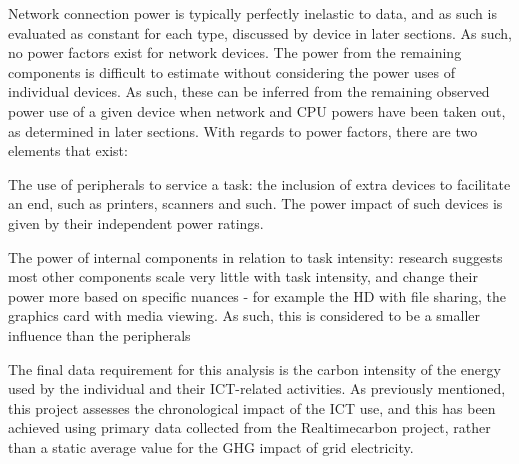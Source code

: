 \documentclass[conference]{IEEEtran}
\begin{document}
Network connection power is typically perfectly inelastic to data, and
as such is evaluated as constant for each type, discussed by device in
later sections. As such, no power factors exist for network
devices. The power from the remaining components is difficult to
estimate without considering the power uses of individual devices. As
such, these can be inferred from the remaining observed power use of a
given device when network and CPU powers have been taken out, as
determined in later sections. With regards to power factors, there are
two elements that exist:

\begin{compactitem}
\item The use of peripherals to service a task: the inclusion of extra
devices to facilitate an end, such as printers, scanners and such. The
power impact of such devices is given by their independent power
ratings.

\item The power of internal components in relation to task intensity:
  research suggests most other components scale very little with task
intensity, and change their power more based on specific nuances - for
example the HD with file sharing, the graphics card with media
viewing. As such, this is considered to be a smaller influence than
the peripherals
\end{compactitem}





The final data requirement for this analysis is the carbon intensity
of the energy used by the individual and their ICT-related
activities. As previously mentioned, this project assesses the
chronological impact of the ICT use, and this has been achieved using
primary data collected from the Realtimecarbon project, rather than a
static average value for the GHG impact of grid electricity.
\end{document}
